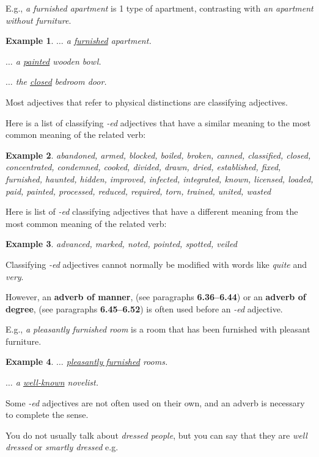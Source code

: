 \documentclass[oneside]{book}
\numberwithin{equation}{section}
\newtheorem{example}{Example}[section]
\begin{document}
E.g., \textit{a furnished apartment} is 1 type of apartment, contrasting with \textit{an apartment without furniture}.
\begin{example}
    $\ldots$ a \underline{furnished} apartment.
    
    $\ldots$ a \underline{painted} wooden bowl.
    
    $\ldots$ the \underline{closed} bedroom door.
\end{example}
Most adjectives that refer to physical distinctions are classifying adjectives.

%
\noindent{} Here is a list of classifying \textit{-ed} adjectives that have a similar meaning to the most common meaning of the related verb:
\begin{example}
    abandoned, armed, blocked, boiled, broken, canned, classified, closed, concentrated, condemned, cooked, divided, drawn, dried, established, fixed, furnished, haunted, hidden, improved, infected, integrated, known, licensed, loaded, paid, painted, processed, reduced, required, torn, trained, united, wasted
\end{example} 
Here is list of \textit{-ed} classifying adjectives that have a different meaning from the most common meaning of the related verb:
\begin{example}
    advanced, marked, noted, pointed, spotted, veiled
\end{example}
%
\noindent{} Classifying \textit{-ed} adjectives cannot normally be modified with words like \textit{quite} and \textit{very}.

However, an \textbf{adverb of manner}, (see paragraphs \textbf{6.36--6.44}) or an \textbf{adverb of degree}, (see paragraphs \textbf{6.45--6.52}) is often used before an \textit{-ed} adjective.

%
E.g., \textit{a pleasantly furnished room} is a room that has been furnished with pleasant furniture.
\begin{example}
    $\ldots$ \underline{pleasantly furnished} rooms.
    
    $\ldots$ a \underline{well-known} novelist.
\end{example} 
%
\noindent{} Some \textit{-ed} adjectives are not often used on their own, and an adverb is necessary to complete the sense.

You do not usually talk about \textit{dressed people}, but you can say that they are \textit{well dressed} or \textit{smartly dressed} e.g.
\end{document}
